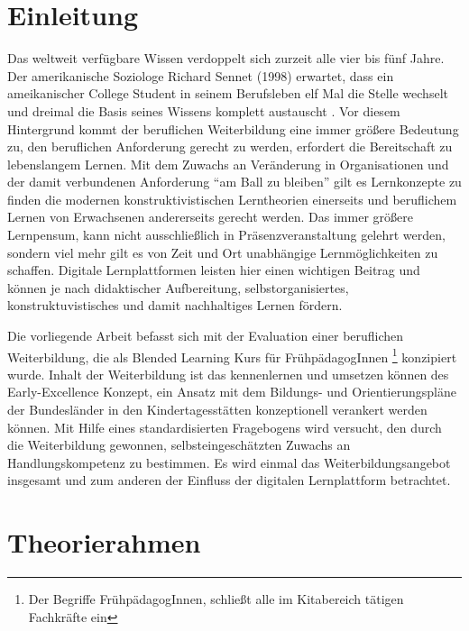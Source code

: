 \documentclass[12pt, bibliography=totoc]{scrartcl}
\begin{document}
%
\tableofcontents
\setcounter{page}{1}
\pagebreak

\section{Einleitung}\label{einleitung}

\glqq Das weltweit verfügbare Wissen verdoppelt sich zurzeit alle vier
bis fünf Jahre. Der amerikanische Soziologe Richard Sennet (1998)
erwartet, dass ein ameikanischer College Student in seinem Berufsleben
elf Mal die Stelle wechselt und dreimal die Basis seines Wissens
komplett austauscht \parencite[138]{Ehlers2002}.\grqq{} Vor diesem
Hintergrund kommt der beruflichen Weiterbildung eine immer größere
Bedeutung zu, den beruflichen Anforderung gerecht zu werden, erfordert
die Bereitschaft zu lebenslangem Lernen. Mit dem Zuwachs an Veränderung
in Organisationen und der damit verbundenen Anforderung \enquote{am Ball
zu bleiben} gilt es Lernkonzepte zu finden die modernen
konstruktivistischen Lerntheorien einerseits und beruflichem Lernen von
Erwachsenen andererseits gerecht werden. Das immer größere Lernpensum,
kann nicht ausschließlich in Präsenzveranstaltung gelehrt werden,
sondern viel mehr gilt es von Zeit und Ort unabhängige Lernmöglichkeiten
zu schaffen. Digitale Lernplattformen leisten hier einen wichtigen
Beitrag und können je nach didaktischer Aufbereitung,
selbstorganisiertes, konstruktuvistisches und damit nachhaltiges Lernen
fördern.

Die vorliegende Arbeit befasst sich mit der Evaluation einer beruflichen
Weiterbildung, die als Blended Learning Kurs für FrühpädagogInnen
\footnote{Der Begriffe FrühpädagogInnen, schließt alle im Kitabereich tätigen Fachkräfte ein}
konzipiert wurde. Inhalt der Weiterbildung ist das kennenlernen und
umsetzen können des Early-Excellence Konzept, ein Ansatz mit dem
Bildungs- und Orientierungspläne der Bundesländer in den
Kindertagesstätten konzeptionell verankert werden können. Mit Hilfe
eines standardisierten Fragebogens wird versucht, den durch die
Weiterbildung gewonnen, selbsteingeschätzten Zuwachs an
Handlungskompetenz zu bestimmen. Es wird einmal das
Weiterbildungsangebot insgesamt und zum anderen der Einfluss der
digitalen Lernplattform betrachtet.

\section{Theorierahmen}\label{theorierahmen}
\end{document}
